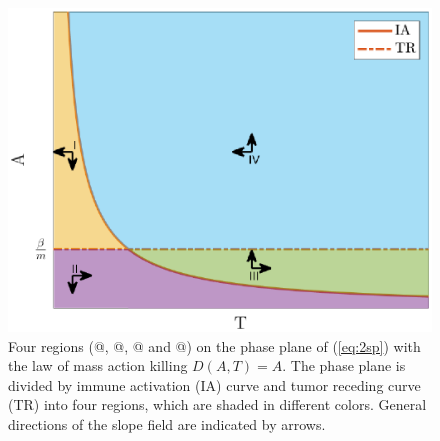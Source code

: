 \documentclass[review,authoryear]{elsarticle}
\makeatletter
\newcommand*{\rom}[1]{\expandafter\@slowromancap\romannumeral #1@}
\makeatother
\begin{document}
\begin{figure}
\centerline{\includegraphics[width=1\linewidth]{figs/DA-colored-regions}}

\caption{Four regions (\rom{1}, \rom{2}, \rom{3} and \rom{4}) on the phase plane of (\ref{eq:2sp}) with the law of mass action killing $D(A,T)=A$. The phase plane is divided by immune activation (IA) curve and tumor receding curve (TR) into four regions, which are 
shaded in different colors. General directions of the slope field
are indicated by arrows.  \label{fig:DA-PP-4regions}}
\end{figure}
\end{document}
